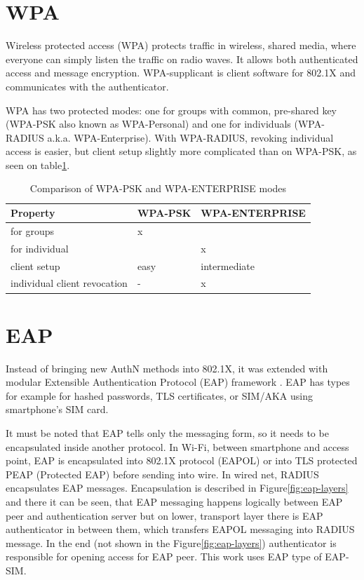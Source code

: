 \documentclass[12pt,a4paper,english]{tutthesis}
\begin{document}
\section{WPA}
\label{sec-2-3}

Wireless protected access (WPA) protects traffic in wireless,
shared media, where everyone can simply listen the traffic on
radio waves. It allows both authenticated access and message
encryption.
WPA-supplicant is client software for 802.1X and communicates with the authenticator.

WPA has two protected modes: one for groups with common, pre-shared
key (WPA-PSK also known as WPA-Personal) and one for individuals
(WPA-RADIUS a.k.a. WPA-Enterprise).  With WPA-RADIUS, revoking
individual access is easier, but client setup slightly more
complicated than on WPA-PSK, as seen on table\ref{psk-enterprise}.

\begin{table}[htb]
\caption{\label{psk-enterprise}Comparison of WPA-PSK and WPA-ENTERPRISE modes}
\centering
\begin{tabular}{lll}
Property & WPA-PSK & WPA-ENTERPRISE\\
\hline
for groups & x & \\
for individual &  & x\\
client setup & easy & intermediate\\
individual client revocation & - & x\\
\hline
\end{tabular}
\end{table}

\section{EAP}
\label{sec-2-4}

Instead of bringing new AuthN methods into 802.1X, it was 
extended with modular Extensible Authentication Protocol (EAP) 
framework \cite{rfc5247}. EAP has types for example for hashed
passwords, TLS certificates, or SIM/AKA using smartphone's SIM card.

It must be noted that EAP tells only the messaging form, so it needs
to be encapsulated inside another protocol.  In Wi-Fi, between
smartphone and access point, EAP is encapsulated into 802.1X protocol
(EAPOL) or into TLS protected PEAP (Protected EAP) \cite{peap} before
sending into wire. In wired net, RADIUS encapsulates EAP
messages. Encapsulation is described in Figure\ref{fig:eap-layers}
and there it can be seen, that 
EAP messaging happens logically between EAP peer and authentication
server but on lower, transport layer there is EAP authenticator in
between them, which transfers EAPOL messaging into RADIUS message.
In the end (not shown in the Figure\ref{fig:eap-layers}) authenticator is
responsible for opening access for EAP peer. This work uses EAP type of EAP-SIM.
\end{document}
